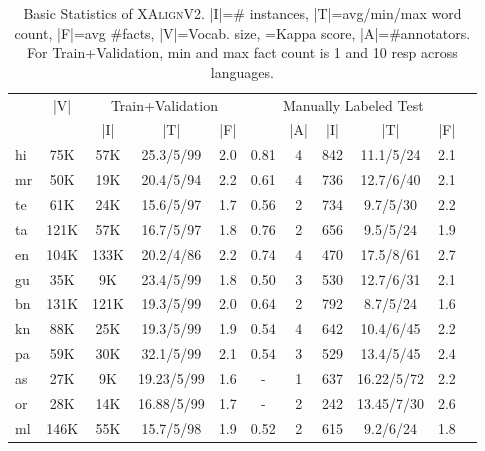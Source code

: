 \documentclass[runningheads]{llncs}
\newcommand{\data}{\textsc{XAlignV2}}
\begin{document}
\begin{table}[!t]
    \centering
    \scriptsize
    \begin{tabular}{|l|c|c|c|c|c|c|c|c|c|c|}
    \hline
    &\multirow{2}{*}{|V|}&\multicolumn{3}{c|}{Train+Validation}&\multicolumn{5}{c|}{Manually Labeled Test}\\
    \cline{3-10}
& &|I|&|T|& |F|& &|A| &|I|&|T|&|F|\\
    \hline
    \hline
    hi&75K&57K&25.3/5/99&2.0&0.81&4&842&11.1/5/24&2.1\\
    \hline
    mr&50K&19K&20.4/5/94&2.2&0.61&4&736&12.7/6/40&2.1\\
    \hline
    te&61K&24K&15.6/5/97&1.7&0.56&2&734&9.7/5/30&2.2\\
    \hline
    ta&121K&57K&16.7/5/97&1.8&0.76&2&656&9.5/5/24&1.9\\
    \hline
    en&104K&133K&20.2/4/86&2.2&0.74&4&470&17.5/8/61&2.7\\
    \hline
    gu&35K&9K&23.4/5/99&1.8&0.50&3&530&12.7/6/31&2.1\\
    \hline
    bn&131K&121K&19.3/5/99&2.0&0.64&2&792&8.7/5/24&1.6\\
    \hline
    kn&88K&25K&19.3/5/99&1.9&0.54&4&642&10.4/6/45&2.2\\
    \hline
    pa&59K&30K&32.1/5/99&2.1&0.54&3&529&13.4/5/45&2.4\\
    \hline
    as&27K&9K&19.23/5/99&1.6&-&1&637&16.22/5/72&2.2\\
    \hline
    or&28K&14K&16.88/5/99&1.7&-&2&242&13.45/7/30&2.6\\
    \hline
    ml&146K&55K&15.7/5/98&1.9&0.52&2&615&9.2/6/24&1.8\\
    \hline
\end{tabular}
    \caption{Basic Statistics of \data{}. |I|=\# instances, |T|=avg/min/max word count, |F|=avg \#facts, |V|=Vocab. size, =Kappa score, |A|=\#annotators. For Train+Validation, min and max fact count is 1 and 10 resp across languages.\protect\footnotemark}
    \label{tab:xalignDataStats}
\end{table}

\end{document}
